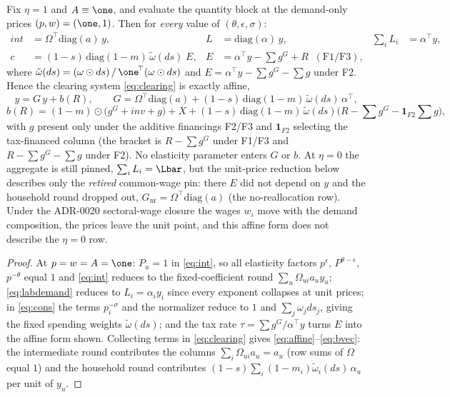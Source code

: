 \begin{lemma}\label{lem:affine}
Fix $\eta = 1$ and $A \equiv \one$, and evaluate the quantity block at the
demand-only prices $(p,w) = (\one,1)$. Then for \emph{every} value of
$(\theta,\epsilon,\sigma)$:
\begin{align}
int &= \Omega^{\!\top}\mathrm{diag}(a)\, y, &
L &= \mathrm{diag}(\alpha)\, y, &
\sum_i L_i &= \alpha^{\!\top} y,
\label{eq:leontiefblocks}\\
c &= (1-s)\,\mathrm{diag}(1-m)\,\tilde\omega(ds)\; E, &
E &= \alpha^{\!\top} y - \textstyle\sum g^G + R
   \;\; (\text{F1/F3}), \nonumber
\end{align}
where $\tilde\omega(ds) = (\omega \odot ds)\,/\, \one^{\!\top}(\omega \odot
ds)$ and $E = \alpha^{\!\top} y - \sum g^G - \sum g$ under F2. Hence the
clearing system \eqref{eq:clearing} is exactly affine,
\begin{equation}
y = G\, y + b(R),
\qquad
G = \Omega^{\!\top}\mathrm{diag}(a)
  + (1-s)\,\mathrm{diag}(1-m)\,\tilde\omega(ds)\,\alpha^{\!\top},
\label{eq:affine}
\end{equation}
\begin{equation}
b(R) = (1-m)\odot\big( g^G + inv + g \big) + X
     + (1-s)\,\mathrm{diag}(1-m)\,\tilde\omega(ds)
       \big( R - \textstyle\sum g^G - \mathbf{1}_{F2}\textstyle\sum g \big),
\label{eq:bvec}
\end{equation}
with $g$ present only under the additive financings
F2/F3 and $\mathbf{1}_{F2}$ selecting the tax-financed column (the bracket is
$R-\sum g^G$ under F1/F3 and $R-\sum g^G-\sum g$ under F2).
No elasticity parameter enters $G$ or $b$. At
$\eta = 0$ the aggregate is still pinned, $\sum_i L_i = \Lbar$, but the
unit-price reduction below describes only the \emph{retired} common-wage
pin: there $E$ did not depend on $y$ and the household round dropped out,
$G_{\mathrm{nr}} = \Omega^{\!\top}\mathrm{diag}(a)$ (the no-reallocation
row). Under the ADR-0020 sectoral-wage
closure the wages $w_i$ move with the demand composition, the prices leave
the unit point, and this affine form does not describe the $\eta = 0$ row.
\end{lemma}

\begin{proof}
At $p = w = A = \one$: $P_u = 1$ in \eqref{eq:int}, so all elasticity
factors $p^{\epsilon}$, $P^{\theta-\epsilon}$, $p^{-\theta}$ equal $1$ and
\eqref{eq:int} reduces to the fixed-coefficient round
$\sum_u \Omega_{ui} a_u y_u$; \eqref{eq:labdemand} reduces to
$L_i = \alpha_i y_i$ since every exponent collapses at unit prices; in
\eqref{eq:cons} the terms $p_i^{-\sigma}$ and the normalizer reduce to
$1$ and $\sum_j \omega_j ds_j$, giving the fixed spending weights
$\tilde\omega(ds)$; and the tax rate $\tau = \sum g^G / \alpha^{\!\top}y$
turns $E$ into the affine form shown. Collecting terms in
\eqref{eq:clearing} gives \eqref{eq:affine}--\eqref{eq:bvec}: the
intermediate round contributes the columns
$\sum_i \Omega_{ui} a_u = a_u$ (row sums of $\Omega$ equal $1$) and the
household round contributes $(1-s)\sum_i (1-m_i)\tilde\omega_i(ds)\,
\alpha_u$ per unit of $y_u$.
\end{proof}

